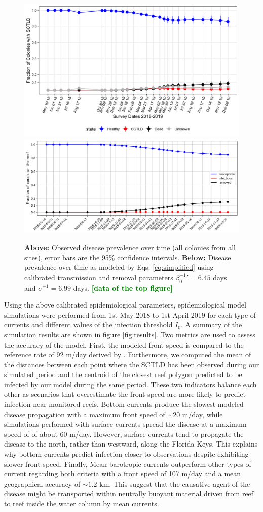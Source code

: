 \documentclass[utf8]{frontiersSCNS}
\newcommand{\erinn}[1]{\textbf{\textcolor{green}{#1}}}
\begin{document}
\begin{figure}
    \centering
    \includegraphics[width=.7\textwidth]{figures/image2.png}
    \includegraphics[width=.69\textwidth]{figures/sir_obs.png}
    \caption{\textbf{Above:} Observed disease prevalence over time (all colonies from all sites), error bars are the 95\% confidence intervals. \textbf{Below:} Disease prevalence over time as modeled by Eqs. \ref{eq:simplified} using calibrated transmission and removal parameters  $\beta_0^{-1}'=6.45$ days and $\sigma^{-1}=6.99$ days. \erinn{[data of the top figure]}}
    \label{fig:calibration}
\end{figure}

Using the above calibrated epidemiological parameters, epidemiological model simulations were performed from 1st May 2018 to 1st April 2019 for each type of currents and different values of the infection threshold $I_0$. A summary of the simulation results are shown in figure \ref{fig:results}. Two metrics are used to assess the accuracy of the model. First, the modeled front speed is compared to the reference rate of 92 m/day derived by \cite{muller2020spatial}. Furthermore, we computed the mean of the distances between each point where the SCTLD has been observed during our simulated period and the centroid of the closest reef polygon predicted to be infected by our model during the same period. These two indicators balance each other as scenarios that overestimate the front speed are more likely to predict infection near monitored reefs. Bottom currents produce the slowest modeled disease propagation with a maximum front speed of $\sim 20$ m/day, while simulations performed with surface currents spread the disease at a maximum speed of of about 60 m/day. However, surface currents tend to propagate the disease to the north, rather than westward, along the Florida Keys. This explains why bottom currents predict infection closer to observations despite exhibiting slower front speed. Finally, Mean barotropic currents outperform other types of current regarding both criteria with a front speed of 107 m/day and a mean geographical accuracy of $\sim1.2$ km. This suggest that the causative agent of the disease might be transported within neutrally buoyant material driven from reef to reef inside the water column by mean currents.
\end{document}
